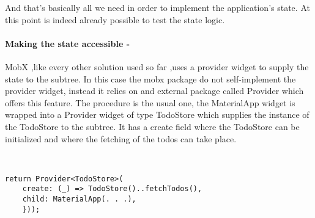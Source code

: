 And that’s basically all we need in order to implement the application’s state. At this point is indeed already possible to test the state logic.

\paragraph{Making the state accessible - }
\label{subpar:todo_app_bloc_core_state} MobX ,like every other solution used so far ,uses a provider widget to supply the state to the subtree. In this case the mobx package do not self-implement the provider widget, instead it relies on and external package called Provider which offers this feature. The procedure is the usual one, the MaterialApp widget is wrapped into a Provider widget of type TodoStore which supplies the instance of the TodoStore to the subtree. It has a create field where the TodoStore can be initialized and where the fetching of the todos can take place.
\begin{code}
\mbox{}\\
 \mbox{}
		\label{code:2.14}
\begin{verbatim}
return Provider<TodoStore>(
    create: (_) => TodoStore()..fetchTodos(),
    child: MaterialApp(. . .),
    }));
\end{verbatim}
\mbox{}
\end{code}




